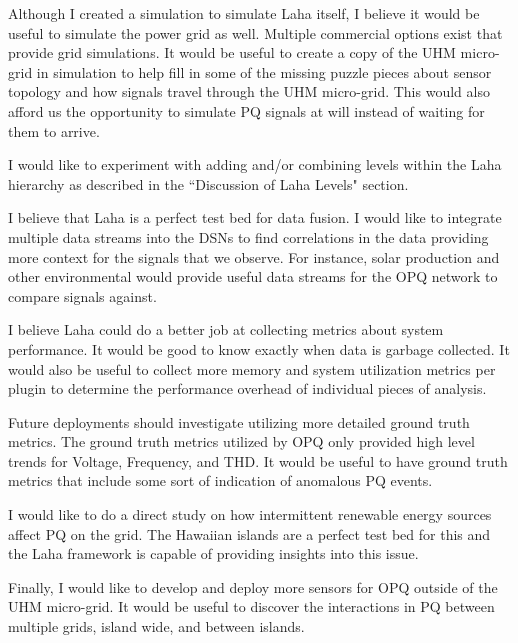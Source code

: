 Although I created a simulation to simulate Laha itself, I believe it would be useful to simulate the power grid as well. Multiple commercial options exist that provide grid simulations. It would be useful to create a copy of the UHM micro-grid in simulation to help fill in some of the missing puzzle pieces about sensor topology and how signals travel through the UHM micro-grid. This would also afford us the opportunity to simulate PQ signals at will instead of waiting for them to arrive.

I would like to experiment with adding and/or combining levels within the Laha hierarchy as described in the ``Discussion of Laha Levels" section.

I believe that Laha is a perfect test bed for data fusion. I would like to integrate multiple data streams into the DSNs to find correlations in the data providing more context for the signals that we observe. For instance, solar production and other environmental would provide useful data streams for the OPQ network to compare signals against.

I believe Laha could do a better job at collecting metrics about system performance. It would be good to know exactly when data is garbage collected. It would also be useful to collect more memory and system utilization metrics per plugin to determine the performance overhead of individual pieces of analysis.

Future deployments should investigate utilizing more detailed ground truth metrics. The ground truth metrics utilized by OPQ only provided high level trends for Voltage, Frequency, and THD. It would be useful to have ground truth metrics that include some sort of indication of anomalous PQ events.

I would like to do a direct study on how intermittent renewable energy sources affect PQ on the grid. The Hawaiian islands are a perfect test bed for this and the Laha framework is capable of providing insights into this issue.

Finally, I would like to develop and deploy more sensors for OPQ outside of the UHM micro-grid. It would be useful to discover the interactions in PQ between multiple grids, island wide, and between islands.

